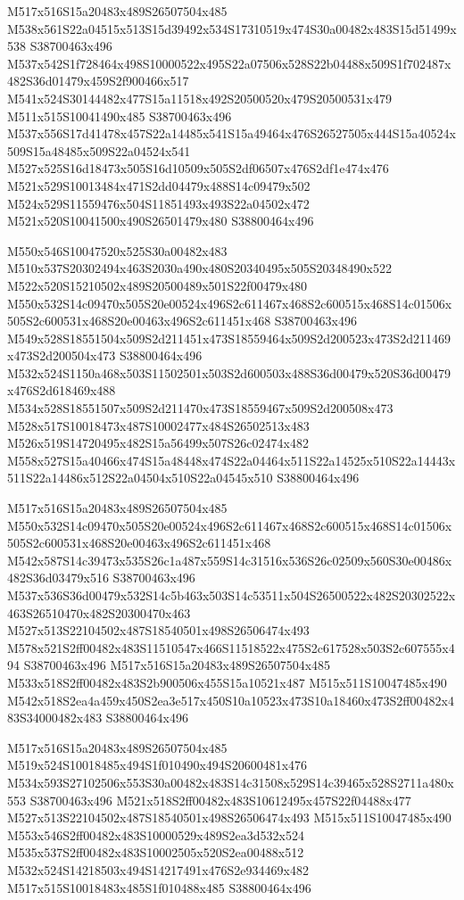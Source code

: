 \documentclass{article}
\begin{document}
\begin{multicols}{2}
M517x516S15a20483x489S26507504x485 M538x561S22a04515x513S15d39492x534S17310519x474S30a00482x483S15d51499x538 S38700463x496 M537x542S1f728464x498S10000522x495S22a07506x528S22b04488x509S1f702487x482S36d01479x459S2f900466x517 M541x524S30144482x477S15a11518x492S20500520x479S20500531x479 M511x515S10041490x485 S38700463x496 M537x556S17d41478x457S22a14485x541S15a49464x476S26527505x444S15a40524x509S15a48485x509S22a04524x541 M527x525S16d18473x505S16d10509x505S2df06507x476S2df1e474x476 M521x529S10013484x471S2dd04479x488S14c09479x502 M524x529S11559476x504S11851493x493S22a04502x472 M521x520S10041500x490S26501479x480 S38800464x496

M550x546S10047520x525S30a00482x483 M510x537S20302494x463S2030a490x480S20340495x505S20348490x522 M522x520S15210502x489S20500489x501S22f00479x480 M550x532S14c09470x505S20e00524x496S2c611467x468S2c600515x468S14c01506x505S2c600531x468S20e00463x496S2c611451x468 S38700463x496 M549x528S18551504x509S2d211451x473S18559464x509S2d200523x473S2d211469x473S2d200504x473 S38800464x496 M532x524S1150a468x503S11502501x503S2d600503x488S36d00479x520S36d00479x476S2d618469x488 M534x528S18551507x509S2d211470x473S18559467x509S2d200508x473 M528x517S10018473x487S10002477x484S26502513x483 M526x519S14720495x482S15a56499x507S26c02474x482 M558x527S15a40466x474S15a48448x474S22a04464x511S22a14525x510S22a14443x511S22a14486x512S22a04504x510S22a04545x510 S38800464x496

M517x516S15a20483x489S26507504x485 M550x532S14c09470x505S20e00524x496S2c611467x468S2c600515x468S14c01506x505S2c600531x468S20e00463x496S2c611451x468 M542x587S14c39473x535S26c1a487x559S14c31516x536S26c02509x560S30e00486x482S36d03479x516 S38700463x496 M537x536S36d00479x532S14c5b463x503S14c53511x504S26500522x482S20302522x463S26510470x482S20300470x463 M527x513S22104502x487S18540501x498S26506474x493 M578x521S2ff00482x483S11510547x466S11518522x475S2c617528x503S2c607555x494 S38700463x496 M517x516S15a20483x489S26507504x485 M533x518S2ff00482x483S2b900506x455S15a10521x487 M515x511S10047485x490 M542x518S2ea4a459x450S2ea3e517x450S10a10523x473S10a18460x473S2ff00482x483S34000482x483 S38800464x496

M517x516S15a20483x489S26507504x485 M519x524S10018485x494S1f010490x494S20600481x476 M534x593S27102506x553S30a00482x483S14c31508x529S14c39465x528S2711a480x553 S38700463x496 M521x518S2ff00482x483S10612495x457S22f04488x477 M527x513S22104502x487S18540501x498S26506474x493 M515x511S10047485x490 M553x546S2ff00482x483S10000529x489S2ea3d532x524 M535x537S2ff00482x483S10002505x520S2ea00488x512 M532x524S14218503x494S14217491x476S2e934469x482 M517x515S10018483x485S1f010488x485 S38800464x496


\end{multicols}
\end{document}
